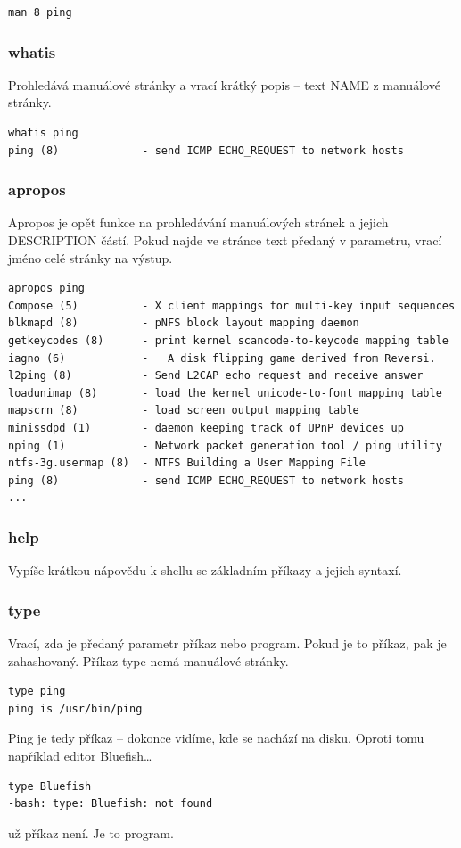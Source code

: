 \documentclass{article}
\begin{document}
\begin{verbatim}
man 8 ping
\end{verbatim}

\subsubsection{whatis}
Prohledává manuálové stránky a vrací krátký popis -- text NAME z manuálové stránky.
\begin{verbatim}
whatis ping
ping (8)             - send ICMP ECHO_REQUEST to network hosts
\end{verbatim} 

\subsubsection{apropos}
Apropos je opět funkce na prohledávání manuálových stránek a jejich DESCRIPTION částí. Pokud najde ve stránce text předaný v parametru, vrací jméno celé stránky na výstup.
\begin{verbatim}
apropos ping
Compose (5)          - X client mappings for multi-key input sequences
blkmapd (8)          - pNFS block layout mapping daemon
getkeycodes (8)      - print kernel scancode-to-keycode mapping table
iagno (6)            -	 A disk flipping game derived from Reversi.
l2ping (8)           - Send L2CAP echo request and receive answer
loadunimap (8)       - load the kernel unicode-to-font mapping table
mapscrn (8)          - load screen output mapping table
minissdpd (1)        - daemon keeping track of UPnP devices up
nping (1)            - Network packet generation tool / ping utility
ntfs-3g.usermap (8)  - NTFS Building a User Mapping File
ping (8)             - send ICMP ECHO_REQUEST to network hosts
...
\end{verbatim}

\subsubsection{help}
Vypíše krátkou nápovědu k shellu se základním příkazy a jejich syntaxí.


\subsubsection{type}
Vrací, zda je předaný parametr příkaz nebo program. Pokud je to příkaz, pak je zahashovaný. Příkaz type nemá manuálové stránky.
\begin{verbatim}
type ping
ping is /usr/bin/ping
\end{verbatim}
Ping je tedy příkaz -- dokonce vidíme, kde se nachází na disku. Oproti tomu například editor Bluefish\dots
\begin{verbatim}
type Bluefish
-bash: type: Bluefish: not found
\end{verbatim}
už příkaz není. Je to program.
\end{document}
